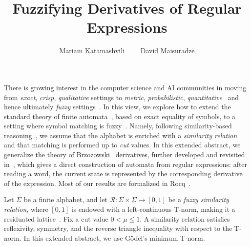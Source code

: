 \documentclass{easychair}
\title{Fuzzifying Derivatives of Regular Expressions}
\author{
Mariam Katamashvili\inst{1}%
\ \ \ \ David Maisuradze\inst{1}
}
\institute{
Kutaisi International University, Kutaisi, Georgia
}
\begin{document}
\maketitle
There is growing interest in the computer science and AI communities in moving from {\em exact}, {\em crisp}, {\em qualitative} settings to {\em metric}, {\em probabilistic}, {\em quantitative}~\cite{AlvesKesnerRamos2025,SilvaBonchiBonsangueRutten2011} and hence ultimately {\em fuzzy} settings~\cite{met05}. In this view, we explore how to extend the standard theory of finite automata~\cite{C71}, based on exact equality of symbols, to a setting where symbol matching is fuzzy~\cite{DHMM}. Namely, following similarity-based reasoning~\cite{Sessa2002},
we assume that the alphabet is enriched with a {\em similarity relation}
and that matching is performed up to {\em cut} values. In this extended abstract, we generalize the theory of
Brzozowski~\cite{B62} derivatives, further developed and revisited
in~\cite{OwensReppyTuron}, which gives a direct construction of automata
from regular expressions: after reading a word, the current state is represented by the
corresponding derivative of the expression. Most of our results are formalized in Rocq~\cite{Rocq}.

Let $\Sigma$ be a finite alphabet, and let
$\mathcal R:\Sigma\times\Sigma\to[0,1]$
be a {\em fuzzy similarity relation}, where $[0,1]$ is endowed with a
left-continuous T-norm, making it a residuated lattice~\cite{met05}.
Fix a cut value $0<\mu\le1$.  A similarity relation satisfies reflexivity, symmetry, and the reverse triangle inequality with respect to the T-norm. In this extended abstract, we use G\"odel's minimum T-norm.
\end{document}
